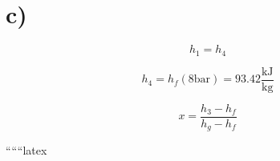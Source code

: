 

\section*{c)}

\[
h_1 = h_4
\]

\[
h_4 = h_f(8 \text{bar}) = 93.42 \frac{\text{kJ}}{\text{kg}}
\]

\[
x = \frac{h_3 - h_f}{h_g - h_f}
\]

``````latex
